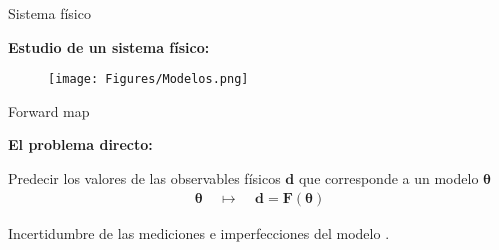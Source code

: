 \documentclass[10pt]{beamer}
\begin{document}
\begin{frame}[fragile]{Sistema físico}

  \textbf{Estudio de un sistema físico:}
  \begin{figure}[H] 
      \centering 
      \texttt{[image: Figures/Modelos.png]} 
  \end{figure} 

\end{frame}

\begin{frame}[fragile]{Forward map}
  
  \textbf{El problema directo:}
  
  Predecir los valores de las observables físicos $\mathbf{d}$ que corresponde a un modelo $\boldsymbol{\theta}$
  \begin{align*}
      \boldsymbol{\theta} \:\:\:\:\: \mapsto \:\:\:\:\: \mathbf{d} = \mathbf{F(\boldsymbol{\theta})}
  \end{align*}


  \vspace*{1 cm}

  Incertidumbre de las mediciones e imperfecciones del modelo \cite{tarantola2005inverse}. 

\end{frame}
\end{document}
